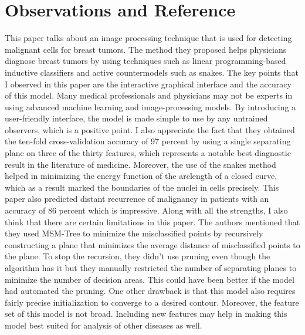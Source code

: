 \documentclass[a4paper]{article}
\begin{document}
\section*{Observations and Reference}
This paper talks about an image processing technique that is used for detecting malignant cells for breast tumors. The method they proposed helps physicians diagnose breast tumors by using techniques such as linear programming-based inductive classifiers and active countermodels such as snakes. The key points that I observed in this paper are the interactive graphical interface and the accuracy of this model. Many medical professionals and physicians may not be experts in using advanced machine learning and image-processing models.  By introducing a user-friendly interface, the model is made simple to use by any untrained observers, which is a positive point. I also appreciate the fact that they obtained the ten-fold cross-validation accuracy of 97 percent by using a single separating plane on three of the thirty features, which represents a notable best diagnostic result in the literature of medicine. Moreover, the use of the snakes method helped in minimizing the energy function of the arclength of a closed curve, which as a result marked the boundaries of the nuclei in cells precisely. This paper also predicted distant recurrence of malignancy in patients with an accuracy of 86 percent which is impressive. 
Along with all the strengths, I also think that there are certain limitations in this paper. The authors mentioned that they used MSM-Tree to minimize the misclassified points by recursively constructing a plane that minimizes the average distance of misclassified points to the plane. To stop the recursion, they didn't use pruning even though the algorithm has it but they manually restricted the number of separating planes to minimize the number of decision areas. This could have been better if the model had automated the pruning. One other drawback is that this model also requires fairly precise initialization to converge to a desired contour. Moreover, the feature set of this model is not broad. Including new features may help in making this model best suited for analysis of other diseases as well.
\end{document}
